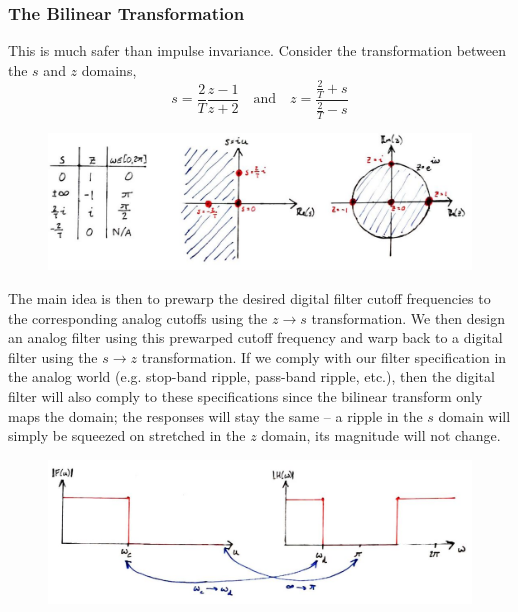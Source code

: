 \subsubsection{The Bilinear Transformation}
%
This is much safer than impulse invariance. Consider the transformation
between the $s$ and $z$ domains,
%
\begin{displaymath}
  s = \frac{2}{T}\frac{z-1}{z+2} \quad\mathrm{and}\quad
  z = \frac{\frac{2}{T} + s}{\frac{2}{T} - s}
\end{displaymath}
%
\begin{figure}[!htb]
  \includegraphics[width=\textwidth]{images/lecture_18_bilinear_transform.JPG}
  \caption{
  }
  \label{fig::lecture_18_bilinear_transform}
\end{figure}
%
The main idea is then to prewarp the desired digital filter cutoff
frequencies to the corresponding analog cutoffs using the $z\rightarrow s$
transformation. We then design an analog filter using this prewarped
cutoff frequency and warp back to a digital filter using the $s\rightarrow z$
transformation. If we comply with our filter specification in the
analog world (e.g. stop-band ripple, pass-band ripple, etc.), then
the digital filter will also comply to these specifications since
the bilinear transform only maps the domain; the responses will
stay the same -- a ripple in the $s$ domain will simply be squeezed
on stretched in the $z$ domain, its magnitude will not change.
%
\begin{figure}[!htb]
  \includegraphics[width=\textwidth]{images/lecture_18_prewarp.JPG}
  \caption{
  }
  \label{fig::lecture_18_prewarp}
\end{figure}
%
